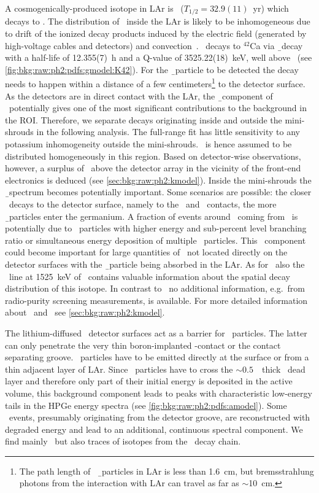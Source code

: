 \blocktitle{\kvz}
A cosmogenically-produced isotope in LAr is \Arh\ ($T_{1/2} = 32.9(11)$~yr) which decays
to \kvz. The distribution of \kvz\ inside the LAr is likely to be inhomogeneous due to
drift of the ionized decay products induced by the electric field (generated by
high-voltage cables and detectors) and convection~\cite{Pelczar2016}. \kvz\ decays to
$^{42}$Ca via \b\ decay with a half-life of 12.355(7)~h and a Q-value of 3525.22(18)~keV,
well above \qbb\ (see \cref{fig:bkg:raw:ph2:pdfs:gmodel:K42}). For the \b\ particle to be
detected the decay needs to happen within a distance of a few centimeters\footnote{%
  The path length of \kvz\ \b\ particles in LAr is less than 1.6~cm, but bremsstrahlung
  photons from the interaction with LAr can travel as far as $\sim$10~cm.
} to the detector surface. As the detectors are
in direct contact with the LAr, the \b\ component of \kvz\ potentially gives one of the
most significant contributions to the background in the ROI. Therefore, we separate decays
originating inside and outside the mini-shrouds in the following analysis. The full-range
fit has little sensitivity to any potassium inhomogeneity outside the mini-shrouds. \kvz\
is hence assumed to be distributed homogeneously in this region. Based on detector-wise
observations, however, a surplus of \kvz\ above the detector array in the vicinity of the
front-end electronics is deduced (see \cref{sec:bkg:raw:ph2:kmodel}). Inside the
mini-shrouds the \b\ spectrum becomes potentially important.  Some scenarios are possible:
the closer \kvz\ decays to the detector surface, namely to the \nplus\ and \pplus\
contacts, the more \b\ particles enter the germanium. A fraction of events around \qbb\
coming from \kvz\ is potentially due to \g\ particles with higher energy and sub-percent
level branching ratio or simultaneous energy deposition of multiple \g\ particles. This
\g\ component could become important for large quantities of \kvz\ not located directly on
the detector surfaces with the \b\ particle being absorbed in the LAr. As for \kvn\ also
the \g\ line at 1525~keV of \kvz\ contains valuable information about the spatial decay
distribution of this isotope. In contrast to \kvn\ no additional information, e.g.~from
radio-purity screening measurements, is available. For more detailed information about
\kvn{}nd \kvz\ see \cref{sec:bkg:raw:ph2:kmodel}.

\blocktitle{\a\ emitters}
The lithium-diffused \nplus\ detector surfaces act as a barrier for \a\ particles. The
latter can only penetrate the very thin boron-implanted \pplus-contact or the contact
separating groove. \a\ particles have to be emitted directly at the surface or from a thin
adjacent layer of LAr. Since \a\ particles have to cross the $\sim 0.5$~\mum\ thick
\pplus\ dead layer and therefore only part of their initial energy is deposited in the
active volume, this background component leads to peaks with characteristic low-energy
tails in the HPGe energy spectra (see \cref{fig:bkg:raw:ph2:pdfs:amodel}). Some \a\
events, presumably originating from the detector groove, are reconstructed with degraded
energy and lead to an additional, continuous spectral component. We find mainly \Po\ but
also traces of isotopes from the \Ra\ decay chain.

